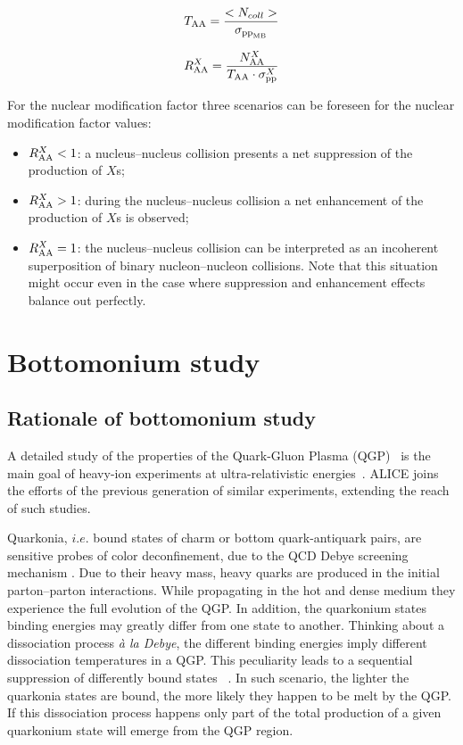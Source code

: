 \begin{equation}
\label{eq:TAA}
T_{\rm{AA}} = \frac{<N_{coll}>}{\sigma_{\rm{pp}_{MB}}}
\end{equation}

\begin{equation}
\label{eq:RAA2}
R_{\rm{AA}}^X = \frac{N_{\rm{AA}}^X}{T_{\rm{AA}} \cdot \sigma_{\rm{pp}}^X}
\end{equation}

For the nuclear modification factor three scenarios can be foreseen for the nuclear modification factor values:
\begin{itemize}
\item $R_{\rm{AA}}^X<1$: a nucleus--nucleus collision presents a net suppression of the production of $X$s;
\item $R_{\rm{AA}}^X>1$: during the nucleus--nucleus collision a net enhancement of the production of $X$s is observed; 
\item $R_{\rm{AA}}^X=1$: the nucleus--nucleus collision can be interpreted as an incoherent superposition of binary nucleon--nucleon collisions. Note that this situation might occur even in the case where suppression and enhancement effects balance out perfectly.
\end{itemize}

\section{Bottomonium study}
\subsection{Rationale of bottomonium study} %
A detailed study of the properties of the Quark-Gluon Plasma (QGP)~\cite{Shuryak:1978ij} is the main goal of heavy-ion experiments at ultra-relativistic energies~\cite{Adams:2005dq,Muller:2012zq}.
ALICE joins the efforts of the previous generation of similar experiments, extending the reach of such studies.

Quarkonia, $i.e.$ bound states of charm or bottom quark-antiquark pairs, are sensitive probes of color deconfinement, due to the QCD Debye screening mechanism  \cite{Matsui:1986dk,Brambilla:2010cs,Andronic:2015wma}. 
Due to their heavy mass, heavy quarks are produced in the initial parton--parton interactions.
While propagating in the hot and dense medium they experience the full evolution of the QGP. 
In addition, the quarkonium states binding energies may greatly differ from one state to another.
Thinking about a dissociation process \textit{à la Debye}, the different binding energies imply different dissociation temperatures in a QGP.
This peculiarity leads to a sequential suppression of differently bound states ~\cite{Digal:2001ue}. 
In such scenario, the lighter the quarkonia states are bound, the more likely they happen to be melt by the QGP.
If this dissociation process happens only part of the total production of a given quarkonium state will emerge from the QGP region.

